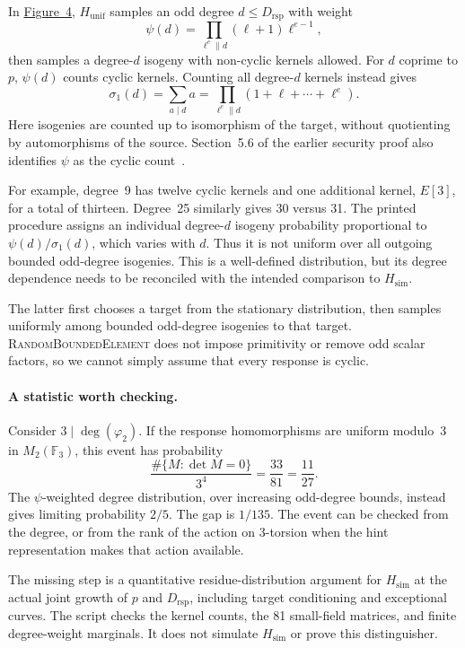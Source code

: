 \documentclass[a4paper,11pt]{article}
\newcommand{\Hsim}{H_{\mathrm{sim}}}
\newcommand{\Hunif}{H_{\mathrm{unif}}}
\newcommand{\Drsp}{D_{\mathrm{rsp}}}
\newcommand{\specurl}{https://sqisign.org/spec/sqisign-20260901.pdf}
\newcommand{\specat}[2]{\href{\specurl\#nameddest=#1}{#2}}
\begin{document}
In \specat{fig:sqihintdistrs}{Figure~4}, $\Hunif$ samples an odd degree
$d\leq\Drsp$ with weight
\[
 \psi(d)=\prod_{\ell^e\parallel d}(\ell+1)\ell^{e-1},
\]
then samples a degree-$d$ isogeny with non-cyclic kernels allowed. For $d$
coprime to $p$, $\psi(d)$ counts cyclic kernels. Counting all degree-$d$
kernels instead gives
\[
 \sigma_1(d)=\sum_{a\mid d}a
 =\prod_{\ell^e\parallel d}(1+\ell+\cdots+\ell^e).
\]
Here isogenies are counted up to isomorphism of the target, without
quotienting by automorphisms of the source. Section~5.6 of the earlier
security proof also identifies $\psi$ as the cyclic count~\cite{proof}.

For example, degree~9 has twelve cyclic kernels and one additional kernel,
$E[3]$, for a total of thirteen. Degree~25 similarly gives 30 versus 31.
The printed procedure assigns an individual degree-$d$ isogeny probability
proportional to $\psi(d)/\sigma_1(d)$, which varies with $d$. Thus it is
not uniform over all outgoing bounded odd-degree isogenies. This is a
well-defined distribution, but its degree dependence needs to be reconciled
with the intended comparison to $\Hsim$.

The latter first chooses a target from the stationary distribution, then
samples uniformly among bounded odd-degree isogenies to that target.
\textsc{RandomBoundedElement} does not impose primitivity or remove odd
scalar factors, so we cannot simply assume that every response is cyclic.

\paragraph{A statistic worth checking.}
Consider $3\mid\deg(\varphi_2)$. If the response homomorphisms are uniform
modulo~3 in $M_2(\mathbb{F}_3)$, this event has probability
\[
 \frac{\#\{M:\det M=0\}}{3^4}=\frac{33}{81}=\frac{11}{27}.
\]
The $\psi$-weighted degree distribution, over increasing odd-degree bounds,
instead gives limiting probability $2/5$. The gap is $1/135$. The event
can be checked from the degree, or from the rank of the action on 3-torsion
when the hint representation makes that action available.

The missing step is a quantitative residue-distribution argument for
$\Hsim$ at the actual joint growth of $p$ and $\Drsp$, including target
conditioning and exceptional curves. The script checks the kernel counts,
the 81 small-field matrices, and finite degree-weight marginals. It does
not simulate $\Hsim$ or prove this distinguisher.
\end{document}
